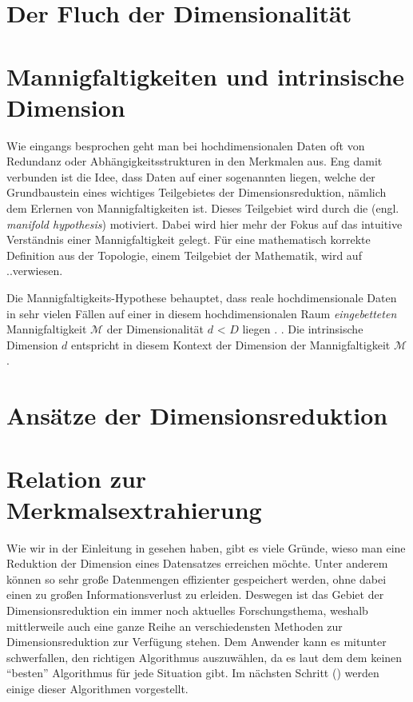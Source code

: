 \section{Der Fluch der Dimensionalität}
\label{ch:Dimensionsreduktion:FluchDerDim}

\section{Mannigfaltigkeiten und intrinsische Dimension}
\label{ch:Dimensionsreduktion:MannigfaltigkeitenIntrinsDim}

Wie eingangs besprochen geht man bei hochdimensionalen Daten oft von Redundanz oder
Abhängigkeitsstrukturen in den Merkmalen aus. Eng damit verbunden ist die Idee, dass Daten auf
einer sogenannten  liegen, welche der Grundbaustein eines wichtiges
Teilgebietes der Dimensionsreduktion, nämlich dem Erlernen von Mannigfaltigkeiten \parencite{Cayton.2005} ist. Dieses Teilgebiet wird durch die 
(engl. \textit{manifold hypothesis}) motiviert. Dabei wird hier mehr der Fokus auf das intuitive
Verständnis einer Mannigfaltigkeit gelegt. Für eine mathematisch korrekte Definition aus der
Topologie, einem Teilgebiet der Mathematik, wird auf ..\addref verwiesen.

Die Mannigfaltigkeits-Hypothese behauptet, dass reale hochdimensionale Daten in sehr vielen Fällen
auf einer in diesem hochdimensionalen Raum \textit{eingebetteten} Mannigfaltigkeit $\mathcal{M}$
der Dimensionalität $d$ < $D$ liegen \parencite[vgl.][1]{Cayton.2005}. . Die
intrinsische Dimension $d$ entspricht in diesem Kontext der Dimension der Mannigfaltigkeit
$\mathcal{M}$.

\section{Ansätze der Dimensionsreduktion}
\label{ch:Dimensionsreduktion:Ansaetze}

\section{Relation zur Merkmalsextrahierung}
\label{ch:Dimensionsreduktion:Merkmalsextrahierung}

Wie wir in der Einleitung in  gesehen haben, gibt es viele Gründe, wieso man
eine Reduktion der Dimension eines Datensatzes erreichen möchte. Unter anderem können so sehr große
Datenmengen effizienter gespeichert werden, ohne dabei einen zu großen Informationsverlust zu
erleiden. Deswegen ist das Gebiet der Dimensionsreduktion ein immer noch aktuelles Forschungsthema,
weshalb mittlerweile auch eine ganze Reihe an verschiedensten Methoden zur Dimensionsreduktion zur
Verfügung stehen. Dem Anwender kann es mitunter schwerfallen, den richtigen Algorithmus
auszuwählen, da es laut dem dem  \parencite{Wolpert.1997} keinen \enquote{besten} Algorithmus für jede Situation gibt. Im nächsten
Schritt () werden einige dieser Algorithmen vorgestellt.